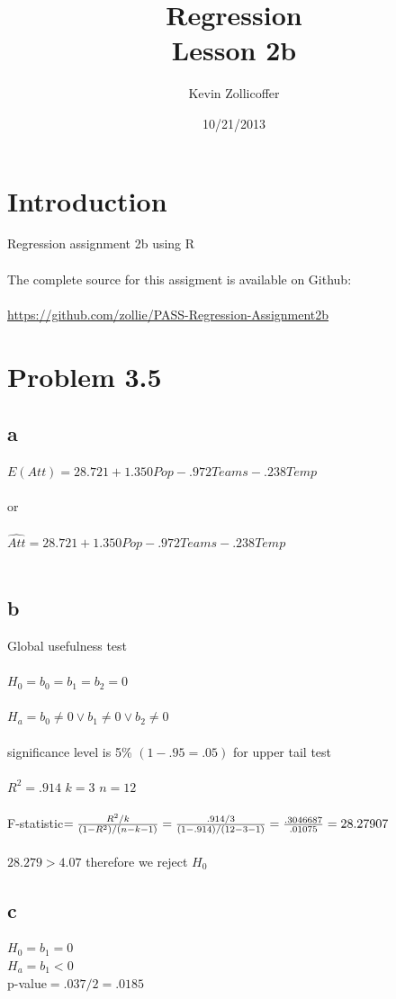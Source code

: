 \documentclass{article}
\author{Kevin Zollicoffer}
\title{Regression\\Lesson 2b}
\date{10/21/2013}
\begin{document}
\maketitle


\section*{Introduction}
Regression assignment 2b using R
\\
\\
The complete source for this assigment is available on Github:
\\
\\
\url{https://github.com/zollie/PASS-Regression-Assignment2b}

\section*{Problem 3.5}
\subsection*{a}
$E(Att) = 28.721+1.350Pop-.972Teams-.238Temp$
\\\\
or
\\\\
$\hat{Att} = 28.721+1.350Pop-.972Teams-.238Temp$
\\\\
\subsection*{b}
Global usefulness test
\\\\
$H_0=b_0=b_1=b_2=0$
\\\\
$H_a=b_0\neq0 \lor b_1\neq0 \lor b_2\neq0$
\\\\
significance level is 5\% $(1-.95 = .05)$ for upper tail test
\\\\
$R^2=.914$
$k=3$
$n=12$
\\\\
F-statistic$={R^2/k \over (1-R^2)/(n-k-1)}={.914/3 \over (1-.914)/(12-3-1)}={.3046687 \over .01075}=28.27907$
\\\\
$28.279 > 4.07$ therefore we reject $H_0$

\subsection*{c}
$H_0=b_1=0$
\\
$H_a=b_1<0$
\\
p-value$=.037/2=.0185$
\end{document}
